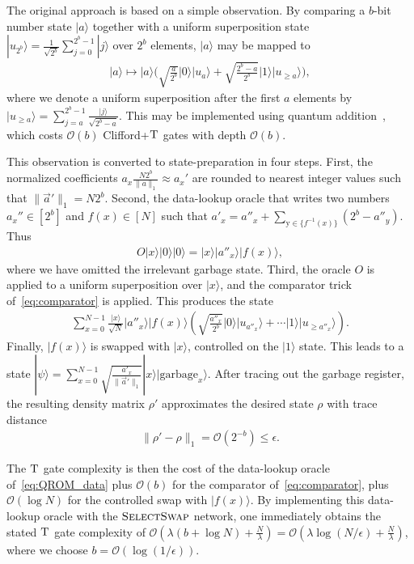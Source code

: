 \documentclass[a4paper,onecolumn,10pt,accepted=2024-05-22]{quantumarticle}
\newcommand{\ket}[1]{| #1\rangle}        %
\begin{document}
	The original approach is based on a simple observation. By comparing a $b$-bit number state $\ket{a}$ together with a uniform superposition state $\ket{u_{2^b}}=\frac{1}{\sqrt{2^b}}\sum_{j=0}^{2^b-1}\ket{j}$ over $2^b$ elements, $\ket{a}$ may be mapped to
	\begin{align}
	\label{eq:comparator}
	\ket{a}\mapsto \ket{a}\Big(
	\sqrt{\frac{a}{2^b}}\ket{0}\ket{u_a}
	+\sqrt{\frac{2^b-a}{2^b}}\ket{1}\ket{u_{\ge a}}
	\Big),
	\end{align}
	where we denote a uniform superposition after the first $a$ elements by $\ket{u_{\ge a}}=\sum_{j=a}^{2^b-1}\frac{\ket{j}}{\sqrt{2^b-a}}$. This may be implemented using quantum addition~\cite{Cuccaro2004Adder}, which costs $\mathcal{O}(b)$ Clifford+$\textsc{T}$ gates with depth $\mathcal{O}(b)$.
	
	This observation is converted to state-preparation in four steps. First, the normalized coefficients $a_x\frac{N2^b}{\|a\|_1}\approx a_x'$ are rounded to nearest integer values such that $\|\vec{a}'\|_1=N2^b$. Second, the data-lookup oracle that writes two numbers $a_x''\in[2^b]$ and $f(x)\in[N]$ such that $a'_x=a''_x+\sum_{\mathrm{y}\in\{f^{-1}(x)\}}(2^b-a''_y)$. Thus
	\begin{align}
	\label{eq:QROM_data}
	O\ket{x}\ket{0}\ket{0}=\ket{x}\ket{a''_x}\ket{f(x)},
	\end{align}
	where we have omitted the irrelevant garbage state. Third, the oracle $O$ is applied to a uniform superposition over $\ket{x}$, and the comparator trick of~\cref{eq:comparator} is applied. This produces the state
	\begin{align}
	\sum_{x=0}^{N-1}\frac{\ket{x}}{\sqrt{N}}\ket{a''_x}\ket{f(x)}\left(\sqrt{\frac{a''_x}{2^b}}\ket{0}\ket{u_{a''_x}}
	+\cdots\ket{1}\ket{u_{\ge {a''_x}}}\right).
	\end{align}
	Finally, $\ket{f(x)}$ is swapped with $\ket{x}$, controlled on the $\ket{1}$ state. This leads to a state $\ket{\psi}=\sum_{x=0}^{N-1} \sqrt{\frac{a'_x}{\|\vec{a}'\|_1}} \ket{x}\ket{\mathrm{garbage}_x}$. After tracing out the garbage register, the resulting density matrix $\rho'$ approximates the desired state $\rho$ with trace distance
	\begin{align}
	\|\rho'-\rho\|_1=\mathcal{O}(2^{-b})\le \epsilon.
	\end{align}
	
	The $\textsc{T}$ gate complexity is then the cost of the data-lookup oracle of~\cref{eq:QROM_data} plus $\mathcal{O}(b)$ for the comparator of~\cref{eq:comparator}, plus $\mathcal{O}(\log{N})$ for the controlled swap with $\ket{f(x)}$. By implementing this data-lookup oracle with the $\textsc{SelectSwap}$ network, one immediately obtains the stated $\textsc{T}$ gate complexity of $\mathcal{O}(\lambda (b+\log{N})+\frac{N}{\lambda})=\mathcal{O}(\lambda\log{(N/\epsilon)}+\frac{N}{\lambda})$, where we choose $b=\mathcal{O}(\log{(1/\epsilon)})$. %
	
\end{document}
